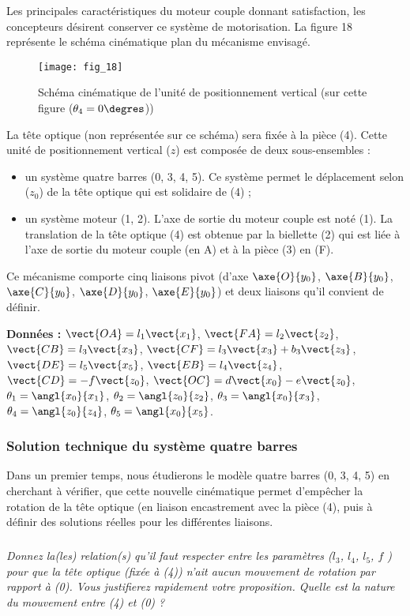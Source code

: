 Les principales caractéristiques du moteur couple donnant satisfaction, les concepteurs désirent conserver ce
système de motorisation. La figure 18 représente le schéma cinématique plan du mécanisme envisagé.

\begin{figure}[H]
\centering
\texttt{[image: fig\_18]}
\caption{\label{fig_18} Schéma cinématique de l'unité de positionnement vertical (sur cette figure ($\theta_4 = 0\degres$))}
\end{figure}

La tête optique (non représentée sur ce schéma) sera fixée à la pièce (4).
Cette unité de positionnement vertical ($z$) est composée de deux sous-ensembles :
\begin{itemize}
\item un système quatre barres (0, 3, 4, 5). Ce système permet le déplacement selon ($z_0$) de la tête optique qui est solidaire de (4) ;
\item un système moteur (1, 2). L’axe de sortie du moteur couple est noté (1). La translation de la tête optique (4) est obtenue par la biellette (2) qui est liée à l’axe de sortie du moteur couple (en A) et à la pièce (3) en (F).
\end{itemize}
Ce mécanisme comporte cinq liaisons pivot (d’axe $\axe{O}{y_0}$, $\axe{B}{y_0}$, $\axe{C}{y_0}$, $\axe{D}{y_0}$, $\axe{E}{y_0}$) et deux liaisons qu’il convient de définir.

\textbf{Données : }
$\vect{OA}=l_1\vect{x_1}$, 
$\vect{FA}=l_2\vect{z_2}$, 
$\vect{CB}=l_3\vect{x_3}$, 
$\vect{CF}=l_3\vect{x_3} +b_3 \vect{z_3} $, 
$\vect{DE}=l_5\vect{x_5}$, 
$\vect{EB}=l_4\vect{z_4}$, 
$\vect{CD}=-f\vect{z_0}$, 
$\vect{OC}=d\vect{x_0}-e\vect{z_0}$, 
$\theta_1 = \angl{x_0}{x_1}$,
$\theta_2 = \angl{z_0}{z_2}$,
$\theta_3 = \angl{x_0}{x_3}$,
$\theta_4 = \angl{z_0}{z_4}$,
$\theta_5 = \angl{x_0}{x_5}$.

\subsubsection{Solution technique du système quatre barres}
Dans un premier temps, nous étudierons le modèle quatre barres (0, 3, 4, 5) en cherchant à vérifier, que
cette nouvelle cinématique permet d’empêcher la rotation de la tête optique (en liaison encastrement avec
la pièce (4), puis à définir des solutions réelles pour les différentes liaisons.

\subparagraph{\label{q_16}}\textit{Donnez la(les) relation(s) qu’il faut respecter entre les paramètres ($l_3$, $l_4$, $l_5$, $f$ ) pour que la tête
optique (fixée à (4)) n’ait aucun mouvement de rotation par rapport à (0). Vous justifierez
rapidement votre proposition.
Quelle est la nature du mouvement entre (4) et (0) ?}
\ifprof
\begin{corrige}
\end{corrige}
\else
\fi

